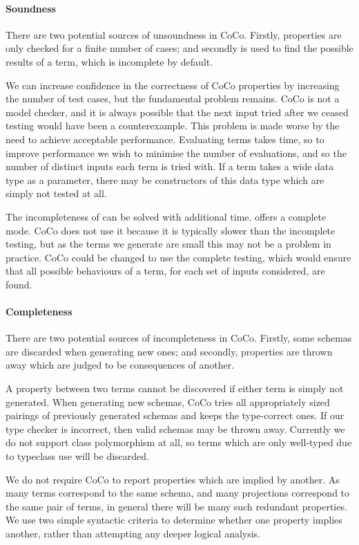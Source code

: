 \paragraph{Soundness}
There are two potential sources of unsoundness in CoCo.  Firstly,
properties are only checked for a finite number of cases; and secondly
\dejafu{} is used to find the possible results of a term, which is
incomplete by default.

We can increase confidence in the correctness of CoCo properties by
increasing the number of test cases, but the fundamental problem
remains.  CoCo is not a model checker, and it is always possible that
the next input tried after we ceased testing would have been a
counterexample.  This problem is made worse by the need to achieve
acceptable performance.  Evaluating terms takes time, so to improve
performance we wish to minimise the number of evaluations, and so the
number of distinct inputs each term is tried with.  If a term takes a
wide data type as a parameter, there may be constructors of this data
type which are simply not tested at all.

The incompleteness of \dejafu{} can be solved with additional time.
\dejafu{} offers a complete mode.  CoCo does not use it because it is
typically slower than the incomplete testing, but as the terms we
generate are small this may not be a problem in practice.  CoCo could
be changed to use the complete testing, which would ensure that all
possible behaviours of a term, for each set of inputs considered, are
found.

\paragraph{Completeness}
There are two potential sources of incompleteness in CoCo.  Firstly,
some schemas are discarded when generating new ones; and secondly,
properties are thrown away which are judged to be consequences of
another.

A property between two terms cannot be discovered if either term is
simply not generated.  When generating new schemas, CoCo tries all
appropriately sized pairings of previously generated schemas and keeps
the type-correct ones.  If our type checker is incorrect, then valid
schemas may be thrown away.  Currently we do not support class
polymorphism at all, so terms which are only well-typed due to
typeclass use will be discarded.

We do not require CoCo to report properties which are implied by
another.  As many terms correspond to the same schema, and many
projections correspond to the same pair of terms, in general there
will be many such redundant properties.  We use two simple syntactic
criteria to determine whether one property implies another, rather
than attempting any deeper logical analysis.

